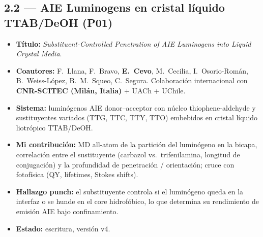 \documentclass[11pt,a4paper]{article}
\begin{document}
\subsection*{2.2 --- AIE Luminogens en cristal líquido TTAB/DeOH (P01)}
\begin{itemize}
    \item \textbf{Título:} \textit{Substituent-Controlled Penetration of AIE Luminogens into Liquid Crystal Media}.
    \item \textbf{Coautores:} F.\ Llana, F.\ Bravo, \textbf{E.\ Cevo}, M.\ Cecilia, I.\ Osorio-Román, B.\ Weiss-López, B.\ M.\ Squeo, C.\ Segura. Colaboración internacional con \textbf{CNR-SCITEC (Milán, Italia)} + UACh + UChile.
    \item \textbf{Sistema:} luminógenos AIE donor--acceptor con núcleo thiophene-aldehyde y sustituyentes variados (TTG, TTC, TTY, TTO) embebidos en cristal líquido liotrópico TTAB/DeOH.
    \item \textbf{Mi contribución:} MD all-atom de la partición del luminógeno en la bicapa, correlación entre el sustituyente (carbazol vs.\ trifenilamina, longitud de conjugación) y la profundidad de penetración / orientación; cruce con fotofísica (QY, lifetimes, Stokes shifts).
    \item \textbf{Hallazgo punch:} el substituyente controla si el luminógeno queda en la interfaz o se hunde en el core hidrofóbico, lo que determina su rendimiento de emisión AIE bajo confinamiento.
    \item \textbf{Estado:} escritura, versión v4.
\end{itemize}
\end{document}
